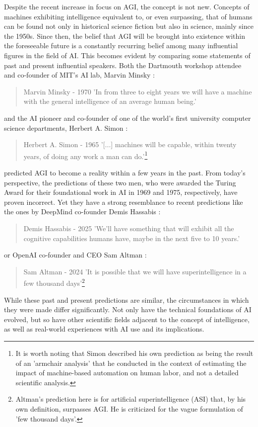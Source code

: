 Despite the recent increase in focus on AGI, the concept is not new.
Concepts of machines exhibiting intelligence equivalent to, or even surpassing, that of humans can be found not only in historical science fiction but also in science, mainly since the 1950s.
Since then, the belief that AGI will be brought into existence within the foreseeable future is a constantly recurring belief among many influential figures in the field of AI.
This becomes evident by comparing some statements of past and present influential speakers.
Both the Dartmouth workshop attendee and co-founder of MIT's AI lab, Marvin Minsky \citep{inc_life_1970}:
\begin{quote}{Marvin Minsky - 1970}
\setlength{\leftskip}{20pt}
'In from three to eight years we will have a machine with the general intelligence of an average human being.'
\end{quote}
and the AI pioneer and co-founder of one of the world's first university computer science departments, Herbert A. Simon \citep[p.96]{simon_shape_1965}:
\begin{quote}{Herbert A. Simon - 1965}
\setlength{\leftskip}{20pt}
'[...] machines will be capable, within twenty years, of doing any work a man can do.'\footnote{It is worth noting that Simon described his own prediction as being the result of an 'armchair analysis' that he conducted in the context of estimating the impact of machine-based automation on human labor, and not a detailed scientific analysis.}
\end{quote}
predicted AGI to become a reality within a few years in the past.
From today's perspective, the predictions of these two men, who were awarded the Turing Award for their foundational work in AI in 1969 and 1975, respectively, have proven incorrect.
Yet they have a strong resemblance to recent predictions like the ones by DeepMind co-founder Demis Hassabis \citep{rose_demis_2025}:
\begin{quote}{Demis Hassabis - 2025}
\setlength{\leftskip}{20pt}
'We’ll have something that will exhibit all the cognitive capabilities humans have, maybe in the next five to 10 years.'
\end{quote}
or OpenAI co-founder and CEO Sam Altman \citep{altman_intelligence_2024}:
\begin{quote}{Sam Altman - 2024}
\setlength{\leftskip}{20pt}
'It is possible that we will have superintelligence in a few thousand days'\footnote{Altman's prediction here is for artificial superintelligence (ASI) that, by his own definition, surpasses AGI. He is criticized for the vague formulation of 'few thousand days'.}
\end{quote}
While these past and present predictions are similar, the circumstances in which they were made differ significantly.
Not only have the technical foundations of AI evolved, but so have other scientific fields adjacent to the concept of intelligence, as well as real-world experiences with AI use and its implications.\\

